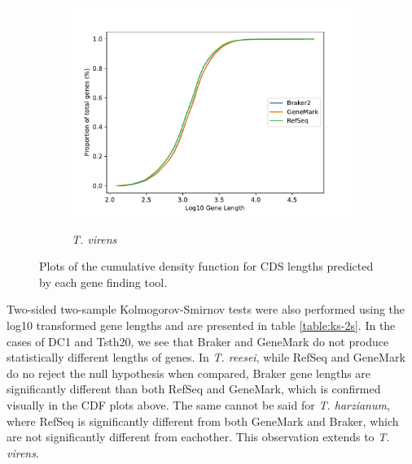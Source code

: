 \begin{figure}[ht]
  \ContinuedFloat
  \centering
    \begin{subfigure}{0.8\textwidth}
      \includegraphics[width=\textwidth]{figures/t-virens-cdf-lengths-log.pdf}
      \label{fig:tvirens-lengths}
      \caption{\textit{T. virens}}
    \end{subfigure}
  \label{fig:cdf-lengths}
  \caption[Cumulative Density Function of Gene Lengths]{Plots of the
    cumulative density function for CDS lengths predicted by each gene
    finding tool.}
\end{figure}

Two-sided two-sample Kolmogorov-Smirnov tests were also performed
using the log10 transformed gene lengths and are presented in table
\ref{table:ks-2s}. In the cases of DC1 and Tsth20, we see that Braker
and GeneMark do not produce statistically different lengths of
genes. In \textit{T. reesei}, while RefSeq and GeneMark do no reject
the null hypothesis when compared, Braker gene lengths are
significantly different than both RefSeq and GeneMark, which is
confirmed visually in the CDF plots above. The same cannot be said for
\textit{T. harzianum}, where RefSeq is significantly different from
both GeneMark and Braker, which are not significantly different from
eachother. This observation extends to \textit{T. virens}.

